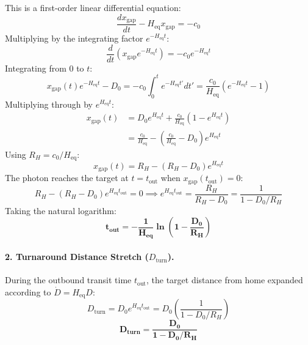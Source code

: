 \documentclass[11pt,a4paper]{article}
\begin{document}
This is a first-order linear differential equation:
\begin{equation}
\frac{d x_{\text{gap}}}{dt} - H_{\text{eq}} x_{\text{gap}} = -c_0
\end{equation}
Multiplying by the integrating factor $e^{-H_{\text{eq}} t}$:
\begin{equation}
\frac{d}{dt}\left(x_{\text{gap}} e^{-H_{\text{eq}} t}\right) = -c_0 e^{-H_{\text{eq}} t}
\end{equation}
Integrating from $0$ to $t$:
\begin{equation}
x_{\text{gap}}(t) e^{-H_{\text{eq}} t} - D_0 = -c_0 \int_0^t e^{-H_{\text{eq}} t'} dt' = \frac{c_0}{H_{\text{eq}}}\left(e^{-H_{\text{eq}} t} - 1\right)
\end{equation}
Multiplying through by $e^{H_{\text{eq}} t}$:
\begin{equation}
\begin{aligned} x_{\text{gap}}(t) &= D_0 e^{H_{\text{eq}} t} + \frac{c_0}{H_{\text{eq}}}\left(1 - e^{H_{\text{eq}} t}\right) \\ &= \frac{c_0}{H_{\text{eq}}} - \left(\frac{c_0}{H_{\text{eq}}} - D_0\right)e^{H_{\text{eq}} t} \end{aligned}
\end{equation}
Using $R_H = c_0 / H_{\text{eq}}$:
\begin{equation}
x_{\text{gap}}(t) = R_H - (R_H - D_0)e^{H_{\text{eq}} t}
\end{equation}
The photon reaches the target at $t = t_{\text{out}}$ when $x_{\text{gap}}(t_{\text{out}}) = 0$:
\begin{equation}
R_H - (R_H - D_0)e^{H_{\text{eq}} t_{\text{out}}} = 0 \implies e^{H_{\text{eq}} t_{\text{out}}} = \frac{R_H}{R_H - D_0} = \frac{1}{1 - D_0 / R_H}
\end{equation}
Taking the natural logarithm:
\begin{equation}
\mathbf{t_{\text{out}} = -\frac{1}{H_{\text{eq}}} \ln\left(1 - \frac{D_0}{R_H}\right)}
\label{eq:t_out_solution}
\end{equation}

\paragraph{2. Turnaround Distance Stretch ($D_{\text{turn}}$).}
During the outbound transit time $t_{\text{out}}$, the target distance from home expanded according to $\dot{D} = H_{\text{eq}} D$:
\begin{equation}
D_{\text{turn}} = D_0 e^{H_{\text{eq}} t_{\text{out}}} = D_0 \left( \frac{1}{1 - D_0 / R_H} \right)
\end{equation}
\begin{equation}
\mathbf{D_{\text{turn}} = \frac{D_0}{1 - D_0 / R_H}}
\label{eq:d_turn_solution}
\end{equation}
\end{document}
